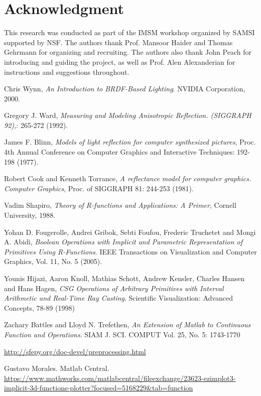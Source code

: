 \documentclass[11pt,reqno]{amsart}
\theoremstyle{definition}
\begin{document}
\section{Acknowledgment}
This research was conducted as part of the IMSM workshop organized by SAMSI supported by NSF. The authors thank Prof. Mansoor Haider and Thomas Gehrmann for organizing and recruiting. The authors also thank John Peach for introducing and guiding the project, as well as Prof. Alen Alexanderian for instructions and suggestions throughout. 
\begin{thebibliography}{9}
Chris Wynn,
\emph{An Introduction to BRDF-Based Lighting}.
NVIDIA Corporation, 2000.

Gregory J. Ward, 
\emph{Measuring and Modeling Anisotropic Reflection. (SIGGRAPH 92),}: 265-272 (1992).

James F. Blinn,  
\emph{Models of light reflection for computer synthesized pictures}, Proc. 4th
Annual Conference on Computer Graphics and Interactive Techniques: 192-198
(1977). 

Robert Cook and Kenneth Torrance,
\emph{A reflectance model for computer graphics. Computer Graphics}, Proc. of SIGGRAPH 81: 244-253 (1981).  

Vadim Shapiro,
\emph{Theory of R-functions and Applications: A Primer}, Cornell University, 1988.

Yohan D. Fougerolle, Andrei Gribok, Sebti Foufou, Frederic Truchetet and Mongi A. Abidi,
\emph{Boolean Operations with Implicit and Parametric Representation of Primitives Using R-Functions}.
IEEE Transactions on Visualization and Computer Graphics, Vol. 11, No. 5 (2005).

Younis Hijazi, Aaron Knoll, Mathias Schott, Andrew Kensler, Charles Hansen and Hans Hagen,
\emph{CSG Operations of Arbitrary Primitives with Interval Arithmetic and Real-Time Ray Casting}.
Scientific Visualization: Advanced Concepts, 78-89 (1998) 
	
 
  Zachary Battles and Lloyd N. Trefethen,
  \emph{An Extension of Matlab to Continuous Function and Operations}.
  SIAM J. SCI. COMPUT Vol. 25, No. 5: 1743-1770 
 
\url{http://sfepy.org/doc-devel/preprocessing.html}

Gustavo Morales. Matlab Central.\\
\url{https://www.mathworks.com/matlabcentral/fileexchange/23623-ezimplot3-implicit-3d-functions-plotter?focused=5168229&tab=function}




	



\end{thebibliography}


%
\end{document}
